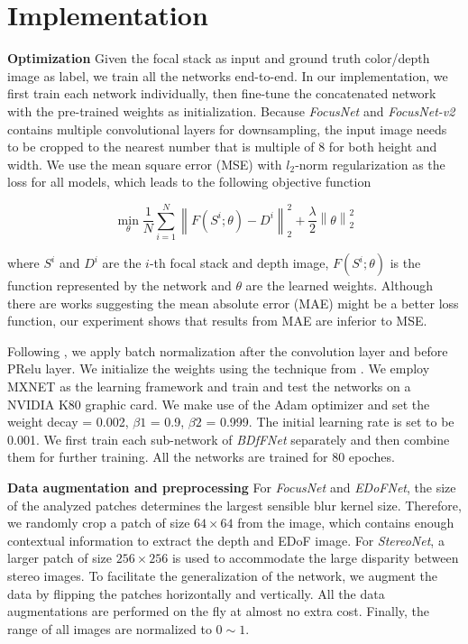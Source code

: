 \documentclass[10pt,twocolumn,letterpaper]{article}
\begin{document}
\section{Implementation}
\label{section:implementation}

\noindent\textbf{Optimization}
Given the focal stack as input and ground truth color/depth image as label, we train all the networks end-to-end. In our implementation, we first train each network individually, then fine-tune the concatenated network with the pre-trained weights as initialization. Because \emph{FocusNet} and \emph{FocusNet-v2} contains multiple convolutional layers for downsampling,
the input image needs to be cropped to the nearest number that is multiple of 8 for both height and width. We use the mean square error (MSE) with $l_2$-norm regularization as the loss for all models, which leads to the following objective function

\begin{equation}
\label{eqn: lossFunction}
    \min_{\theta}\frac{1}{N}\sum_{i=1}^N\left\| F(S^{i};\theta)- D^{i} \right\rVert_{2}^{2} + \frac{\lambda}{2}\left\| \theta \right\rVert_{2}^{2}
\end{equation}

where $S^i$ and $D^i$ are the $i$-th focal stack and depth image, $F(S^{i};\theta)$ is the function represented by the network and $\theta$ are the learned weights. Although there are works \cite{zhao17} suggesting the mean absolute error (MAE) might be a better loss function, our experiment shows that results from MAE are inferior to MSE.

Following \cite{ioffe15}, we apply batch normalization after the convolution layer and before PRelu layer. We initialize the weights using the technique from \cite{he15}. We employ MXNET \cite{chen15} as the learning framework and train and test the networks on a NVIDIA K80 graphic card. We make use of the Adam optimizer \cite{kingma15} and set the weight decay = 0.002, $\beta1$ = 0.9, $\beta2$ = 0.999. The initial learning rate is set to be 0.001. We first train each sub-network of \emph{BDfFNet} separately and then combine them for further training. All the networks are trained for 80 epoches.

\noindent\textbf{Data augmentation and preprocessing}
For \emph{FocusNet} and \emph{EDoFNet}, the size of the analyzed patches determines the largest sensible blur kernel size. Therefore, we randomly crop a patch of size $64\times64$ from the image, which contains enough contextual information to extract the depth and EDoF image. For \emph{StereoNet}, a larger patch of size $256\times256$ is used to accommodate the large disparity between stereo images. To facilitate the generalization of the network, we augment the data by flipping the patches horizontally and vertically. All the data augmentations are performed on the fly at almost no extra cost. Finally, the range of all images are normalized to $0\sim1$.
\end{document}
